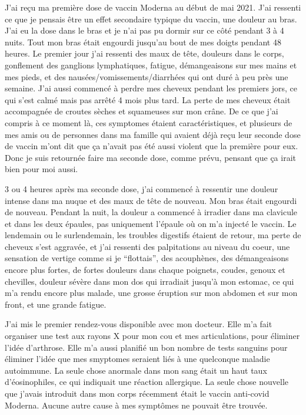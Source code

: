 J'ai reçu ma première dose de vaccin Moderna au début de mai 2021. J'ai ressenti
ce que je pensais être un effet secondaire typique du vaccin, une douleur au
bras. J'ai eu la dose dans le bras et je n'ai pas pu dormir sur ce côté pendant
3 à 4 nuits. Tout mon bras était engourdi jusqu'au bout de mes doigts pendant
48 heures. Le premier jour j'ai ressenti des maux de tête, douleurs dans le
corps, gonflement des ganglions lymphatiques, fatigue, démangeaisons sur mes
mains et mes pieds, et des nausées/vomissements/diarrhées qui ont duré à peu
près une semaine. J'ai aussi commencé à perdre mes cheveux pendant les premiers
jors, ce qui s'est calmé mais pas arrêté 4 mois plus tard. La perte de mes
cheveux était accompagnée de croutes sèches et squameuses sur mon crâne. De ce
que j'ai compris à ce moment là, ces symptomes étaient caractéristiques, et
plusieurs de mes amis ou de personnes dans ma famille qui avaient déjà reçu leur
seconde dose de vaccin m'ont dit que ça n'avait pas été aussi violent que la
première pour eux. Donc je suis retournée faire ma seconde dose, comme prévu,
pensant que ça irait bien pour moi aussi.

3 ou 4 heures après ma seconde dose, j'ai commencé à ressentir une douleur
intense dans ma nuque et des maux de tête de nouveau. Mon bras était engourdi de
nouveau. Pendant la nuit, la douleur a commencé à irradier dans ma clavicule et
dans les deux épaules, pas uniquement l'épaule où on m'a injecté le vaccin. Le
lendemain ou le surlendemain, les troubles digestifs étaient de retour, ma perte
de cheveux s'est aggravée, et j'ai ressenti des palpitations au niveau du coeur,
une sensation de vertige comme si je “flottais”, des acouphènes, des
démangeaisons encore plus fortes, de fortes douleurs dans chaque poignets,
coudes, genoux et chevilles, douleur sévère dans mon dos qui irradiait jusqu'à
mon estomac, ce qui m'a rendu encore plus malade, une grosse éruption sur mon
abdomen et sur mon front, et une grande fatigue.

J'ai mis le premier rendez-vous disponible avec mon docteur. Elle m'a fait
organiser une test aux rayons X pour mon cou et mes articulations, pour éliminer
l'idée d'arthrose. Elle m'a aussi planifié un bon nombre de tests sanguins pour
éliminer l'idée que mes smyptomes seraient liés à une quelconque maladie
autoimmune. La seule chose anormale dans mon sang était un haut taux
d'éosinophiles, ce qui indiquait une réaction allergique. La seule chose
nouvelle que j'avais introduit dans mon corps récemment était le vaccin
anti-covid Moderna. Aucune autre cause à mes symptômes ne pouvait être trouvée.

